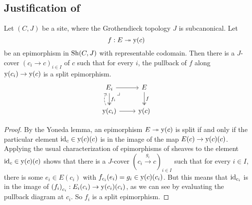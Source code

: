 \subsection{Justification of }

\begin{lemma}
  Let $(C, J)$ be a site,
  where the Grothendieck topology $J$ is subcanonical.
  Let
  \[ f : E \twoheadrightarrow \mathrm{y}(c) \]
  be an epimorphism in $\mathrm{Sh}(C, J)$ with representable codomain.
  Then there is a $J$-cover $(c_i \to c)_{i \in I}$ of $c$
  such that for every $i$,
  the pullback of $f$ along $\mathrm{y}(c_i) \to \mathrm{y}(c)$
  is a split epimorphism.
  \[ \begin{tikzcd}
    E_i \ar[r] \ar[d, two heads, "f_i"] \ar[dr, phantom, very near start, "\lrcorner"] &
    E \ar[d, two heads, "f"] \\
    \yo(c_i) \ar[r] \ar[u, bend left, dashed]&
    \yo(c)
  \end{tikzcd} \]
\end{lemma}

\begin{proof}
  By the Yoneda lemma,
  an epimorphism $E \twoheadrightarrow \mathrm{y}(c)$ is split
  if and only if
  the particular element $\mathrm{id}_c \in \mathrm{y}(c)(c)$
  is in the image of the map $E(c) \to \mathrm{y}(c)(c)$.
  Applying the usual characterization of epimorphisms of sheaves
  \cite[Corollary III.7.5]{maclane-moerdjik}
  to the element $\mathrm{id}_c \in \mathrm{y}(c)(c)$
  shows that there is a $J$-cover ${(c_i \xrightarrow{g_i} c)}_{i \in I}$
  such that for every $i \in I$,
  there is some $e_i \in E(c_i)$
  with $f_{c_i}(e_i) = g_i \in \mathrm{y}(c)(c_i)$.
  But this means that $\mathrm{id}_{c_i}$ is in the image of ${(f_i)}_{c_i} : E_i(c_i) \to \mathrm{y}(c_i)(c_i)$,
  as we can see by evaluating the pullback diagram at $c_i$.
  So $f_i$ is a split epimorphism.
\end{proof}
